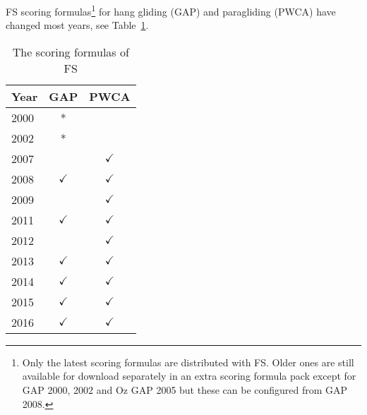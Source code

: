 \documentclass[gap.tex]{subfiles}
\begin{document}
FS scoring formulas\footnote{Only the latest scoring formulas are distributed
with FS.  Older ones are still available for download separately in an extra
scoring formula pack except for GAP 2000, 2002 and Oz GAP 2005 but these can be
configured from GAP 2008.} for hang gliding (GAP) and paragliding (PWCA) have
changed most years, see Table~\ref{tab:fs-gap-versions}.
\begin{table}[!ht]
    \centering
    \begin{tabularx}{0.25\textwidth}{Xcc}
    \hline
         \textbf{Year}
         & \textbf{GAP}
         & \textbf{PWCA}
         \\
    \hline
        2000
        & *
        &
        \\
    \hline
        2002
        & *
        &
        \\
    \hline
        2007
        &
        & $\checkmark$
        \\
    \hline
        2008
        & $\checkmark$
        & $\checkmark$
        \\
    \hline
        2009
        &
        & $\checkmark$
        \\
    \hline
        2011
        & $\checkmark$
        & $\checkmark$
        \\
    \hline
        2012
        &
        & $\checkmark$
        \\
    \hline
        2013
        & $\checkmark$
        & $\checkmark$
        \\
    \hline
        2014
        & $\checkmark$
        & $\checkmark$
        \\
    \hline
        2015
        & $\checkmark$
        & $\checkmark$
        \\
    \hline
        2016
        & $\checkmark$
        & $\checkmark$
        \\
    \hline
    \end{tabularx}
    \caption{The scoring formulas of FS}
    \label{tab:fs-gap-versions}
\end{table}
\end{document}
